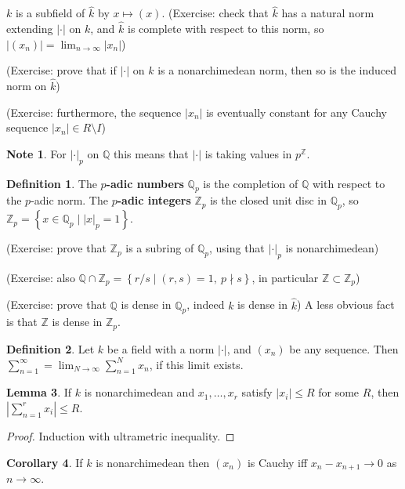\documentclass{article}
\newcommand{\Z}{\mathbb{Z}}
\newcommand{\Q}{\mathbb{Q}}
\newcommand{\rb}[1]{\left( #1 \right)}
\newcommand{\cb}[1]{\left\{ #1 \right\}}
\newcommand{\abs}[1]{\left\lvert #1 \right\rvert}
\theoremstyle{definition}\newtheorem{definition}{Definition}[section]
\theoremstyle{definition}\newtheorem{remark}[definition]{Remark}
\theoremstyle{definition}\newtheorem*{example}{Example}
\theoremstyle{definition}\newtheorem*{note}{Note}
\newtheorem{lemma}[definition]{Lemma}
\newtheorem{corollary}[definition]{Corollary}
\begin{document}
$ k $ is a subfield of $ \widehat{k} $ by $ x \mapsto \rb{x} $. (Exercise: check that $ \widehat{k} $ has a natural norm extending $ \abs{\cdot} $ on $ k $, and $ \widehat{k} $ is complete with respect to this norm, so $ \abs{\rb{x_n}} = \lim_{n \to \infty} \abs{x_n} $)

(Exercise: prove that if $ \abs{\cdot} $ on $ k $ is a nonarchimedean norm, then so is the induced norm on $ \widehat{k} $)

(Exercise: furthermore, the sequence $ \abs{x_n} $ is eventually constant for any Cauchy sequence $ \abs{x_n} \in R \setminus I $)

\begin{note}
For $ \abs{\cdot}_p $ on $ \Q $ this means that $ \abs{\cdot} $ is taking values in $ p^{\Z} $.
\end{note}

\begin{definition}
The \textbf{$ p $-adic numbers} $ \Q_p $ is the completion of $ \Q $ with respect to the $ p $-adic norm. The \textbf{$ p $-adic integers} $ \Z_p $ is the closed unit disc in $ \Q_p $, so $ \Z_p = \cb{x \in \Q_p \mid \abs{x}_p = 1} $.
\end{definition}

(Exercise: prove that $ \Z_p $ is a subring of $ \Q_p $, using that $ \abs{\cdot}_p $ is nonarchimedean)

(Exercise: also $ \Q \cap \Z_p = \cb{r / s \mid \rb{r, s} = 1, \ p \nmid s} $, in particular $ \Z \subset \Z_p $)

(Exercise: prove that $ \Q $ is dense in $ \Q_p $, indeed $ k $ is dense in $ \widehat{k} $) A less obvious fact is that $ \Z $ is dense in $ \Z_p $.

\begin{definition}
Let $ k $ be a field with a norm $ \abs{\cdot} $, and $ \rb{x_n} $ be any sequence. Then $ \sum_{n = 1}^\infty = \lim_{N \to \infty} \sum_{n = 1}^N x_n $, if this limit exists.
\end{definition}

\begin{lemma}
\label{lem:1.10}
If $ k $ is nonarchimedean and $ x_1, \dots, x_r $ satisfy $ \abs{x_i} \le R $ for some $ R $, then $ \abs{\sum_{n = 1}^r x_i} \le R $.
\end{lemma}

\begin{proof}
Induction with ultrametric inequality.
\end{proof}

\begin{corollary}
\label{cor:1.11}
If $ k $ is nonarchimedean then $ \rb{x_n} $ is Cauchy iff $ x_n - x_{n + 1} \to 0 $ as $ n \to \infty $.
\end{corollary}
\end{document}
